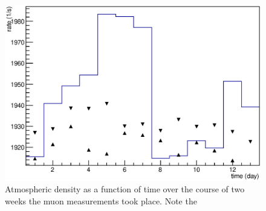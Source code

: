  \begin{figure}
	\centering
  	\includegraphics[width = 0.9 \textwidth]{graphics/setup/rateWeather.eps}
  	\caption[Daily average muon rate]{Atmospheric density as a function of time over the course of two weeks the muon measurements took place. Note the }
  	\label{fig:moduleStability}
  \end{figure}

